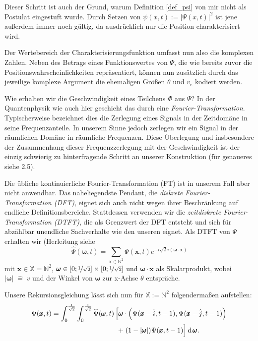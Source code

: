 \documentclass[a4paper,12pt,ngerman]{scrartcl}
\theoremstyle{plain}
\theoremstyle{plain}
\theoremstyle{plain}
\theoremstyle{plain}
\newcommand{\X}{\mathbb{X}}
\newcommand{\N}{\mathbb{N}}
\begin{document}
Dieser Schritt ist auch der Grund, warum Definition \ref{def_psi} von mir nicht als Postulat eingestuft wurde. Durch Setzen von $\psi(x,t):=|\Psi(x,t)|^2$ ist jene außerdem immer noch gültig, da ausdrücklich nur die Position charakterisiert wird.

Der Wertebereich der Charakterisierungsfunktion umfasst nun also die komplexen Zahlen. Neben des Betrags eines Funktionswertes von $\Psi$, die wie bereits zuvor die Positionswahrscheinlichkeiten repräsentiert, können nun zusätzlich durch das jeweilige komplexe Argument die ehemaligen Größen $\theta$ und $v_e$ kodiert werden.

Wie erhalten wir die Geschwindigkeit eines Teilchens $\Phi$ aus $\Psi$? In der Quantenphysik wie auch hier geschieht das durch eine \textit{Fourier-Transformation}. Typischerweise bezeichnet dies die Zerlegung eines Signals in der Zeitdomäne in seine Frequenzanteile. In unserem Sinne jedoch zerlegen wir ein Signal in der räumlichen Domäne in \glqq räumliche Frequenzen\grqq. Diese Überlegung und insbesondere der Zusammenhang dieser Frequenzzerlegung mit der Geschwindigkeit ist der einzig schwierig zu hinterfragende Schritt an unserer Konstruktion (für genaueres siehe 2.5).

Die übliche kontinuierliche Fourier-Transformation (FT) ist in unserem Fall aber nicht anwendbar. Das naheliegendste Pendant, die \textit{diskrete Fourier-Transformation (DFT)}, eignet sich auch nicht wegen ihrer Beschränkung auf endliche Definitionsbereiche. Stattdessen verwenden wir die \textit{zeitdiskrete Fourier-Transformation (DTFT)}, die als Grenzwert der DFT entsteht und sich für abzählbar unendliche Sachverhalte wie den unseren eignet. Als DTFT von $\Psi$ erhalten wir (Herleitung siehe %
\[\widehat{\Psi}(\pmb{\omega},t) = \sum_{\pmb{x}\in\mathbb{N}^2}\Psi(\pmb{x},t)e^{-i\sqrt{2}\tau(\pmb{\omega}\cdot\pmb{x})}\]
mit $\pmb{x}\in\X=\N^2$,\; $\pmb{\omega}\in[0;\nicefrac{1}{\sqrt{2}}]\times[0;\nicefrac{1}{\sqrt{2}}]$ und $\pmb{\omega}\cdot\pmb{x}$ als Skalarprodukt, wobei $|\pmb{\omega}|\;\widehat{=}\;v$ und der Winkel von $\pmb{\omega}$ zur x-Achse $\theta$ entspräche.

Unsere Rekursionsgleichung lässt sich nun für $\X:=\N^2$ folgendermaßen aufstellen:
\begin{align*}
\Psi(\pmb{x},t) = \int_0^{\frac{1}{\sqrt2}}\int_0^{\frac{1}{\sqrt2}} 
\widehat{\Psi}(\pmb{\omega},t)
&\left[
\pmb{\omega}\cdot\left(\Psi(\pmb{x}-\hat{i},t-1),\Psi(\pmb{x}-\hat{j},t-1)\right)
\right.\\
&\left.\;+\;(1-|\pmb{\omega}|)\Psi(\pmb{x},t-1)\vphantom{\hat{\Psi}}\right]
\operatorname{d}\pmb{\omega}. 
\end{align*}
\end{document}

